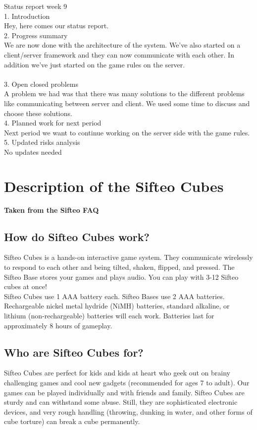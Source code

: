 Status report week 9\\
1. Introduction\\
Hey, here comes our status report.\\

2. Progress summary\\
We are now done with the architecture of the system. We've also started on a client/server framework and they can now communicate with each other. In addition we've just started on the game rules on the server. \\
\\
3. Open closed problems\\ 
A problem we had was that there was many solutions to the different problems like communicating between server and client. We used some time to discuss and choose these solutions. \\

4. Planned work for next period\\ 
Next period we want to continue working on the server side with the game rules.\\

5. Updated risks analysis\\
No updates needed


\chapter{Description of the Sifteo Cubes}

\textbf{Taken from the Sifteo FAQ}


\section{How do Sifteo Cubes work?}
Sifteo Cubes is a hands-on interactive game system. They communicate wirelessly to respond to each other and being tilted, shaken, flipped, and pressed. The Sifteo Base stores your games and plays audio. You can play with 3-12 Sifteo cubes at once!\\
Sifteo Cubes use 1 AAA battery each. Sifteo Bases use 2 AAA batteries. Rechargeable nickel metal hydride (NiMH) batteries, standard alkaline, or lithium (non-rechargeable) batteries will each work. Batteries last for approximately 8 hours of gameplay.

\section{Who are Sifteo Cubes for?}
Sifteo Cubes are perfect for kids and kids at heart who geek out on brainy challenging games and cool new gadgets (recommended for ages 7 to adult). Our games can be played individually and with friends and family. Sifteo Cubes are sturdy and can withstand some abuse. Still, they are sophisticated electronic devices, and very rough handling (throwing, dunking in water, and other forms of cube torture) can break a cube permanently.

